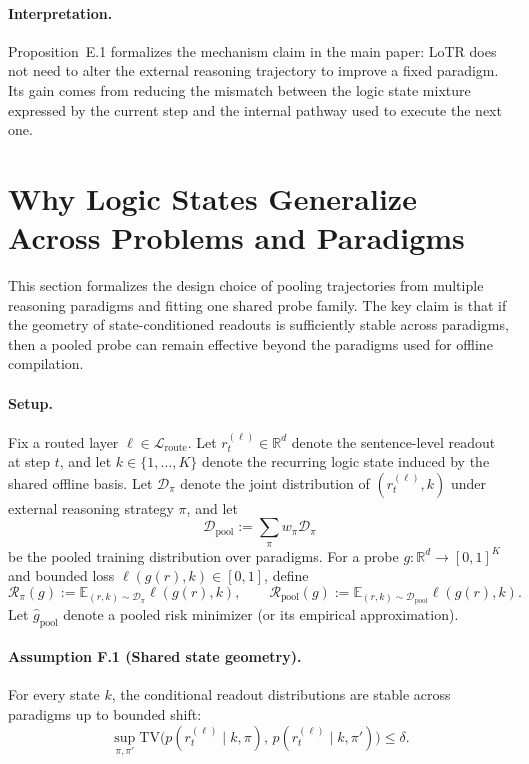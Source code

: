 \paragraph{Interpretation.}
Proposition~E.1 formalizes the mechanism claim in the main paper: LoTR does not need to alter the external reasoning trajectory to improve a fixed paradigm. Its gain comes from reducing the mismatch between the logic state mixture expressed by the current step and the internal pathway used to execute the next one.

\section{Why Logic States Generalize Across Problems and Paradigms}
\label{app:theory_generalize}

This section formalizes the design choice of pooling trajectories from multiple reasoning paradigms and fitting one shared probe family. The key claim is that if the geometry of state-conditioned readouts is sufficiently stable across paradigms, then a pooled probe can remain effective beyond the paradigms used for offline compilation.

\paragraph{Setup.}
Fix a routed layer \(\ell\in\mathcal{L}_{\mathrm{route}}\). Let \(r_t^{(\ell)}\in\mathbb{R}^d\) denote the sentence-level readout at step \(t\), and let \(k\in\{1,\dots,K\}\) denote the recurring logic state induced by the shared offline basis. Let \(\mathcal{D}_{\pi}\) denote the joint distribution of \((r_t^{(\ell)},k)\) under external reasoning strategy \(\pi\), and let
\[
\mathcal{D}_{\mathrm{pool}}
:=
\sum_{\pi} w_\pi \mathcal{D}_{\pi}
\]
be the pooled training distribution over paradigms. For a probe \(g:\mathbb{R}^d\to[0,1]^K\) and bounded loss \(\ell(g(r),k)\in[0,1]\), define
\begin{equation}
\mathcal{R}_{\pi}(g):=\mathbb{E}_{(r,k)\sim\mathcal{D}_{\pi}}\ell(g(r),k),
\qquad
\mathcal{R}_{\mathrm{pool}}(g):=\mathbb{E}_{(r,k)\sim\mathcal{D}_{\mathrm{pool}}}\ell(g(r),k).
\label{eq:app_gen_risk_def}
\end{equation}
Let \(\hat g_{\mathrm{pool}}\) denote a pooled risk minimizer (or its empirical approximation).

\paragraph{Assumption F.1 (Shared state geometry).}
For every state \(k\), the conditional readout distributions are stable across paradigms up to bounded shift:
\begin{equation}
\sup_{\pi,\pi'}\mathrm{TV}\!\bigl(p(r_t^{(\ell)}\mid k,\pi),\,p(r_t^{(\ell)}\mid k,\pi')\bigr)\le \delta.
\label{eq:app_gen_shift}
\end{equation}

